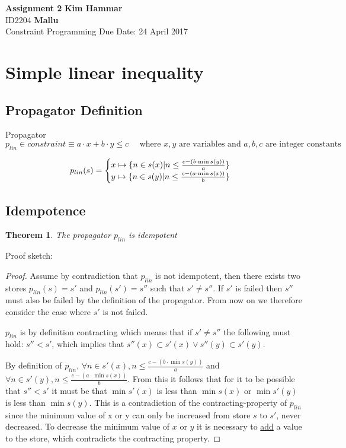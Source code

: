 \documentclass[a4paper, 11pt]{article}
\newtheorem{theorem}{Theorem}[section]
\newcommand\mymapsto{\mathrel{\ooalign{$\rightarrow$\cr%
      \kern-.15ex\raise.275ex\hbox{\scalebox{1}[0.522]{$\mid$}}\cr}}}
\begin{document}
\noindent
\large\textbf{Assignment 2} \hfill \textbf{Kim Hammar} \\
\normalsize ID2204 \hfill  \textbf{Mallu} \\
Constraint Programming \hfill Due Date: 24 April 2017\\

\section*{Simple linear inequality}
\subsection*{Propagator Definition}
Propagator $p_{lin} \in constraint \equiv a \cdot x + b \cdot y \leq c \quad \text{ where }x,y \text{ are variables and } a,b,c \text{ are integer constants} $

\begin{gather*}
p_{lin}(s) = 
\begin{cases}
  x \mymapsto \{n \in s(x) | n \leq \frac{c - (b \cdot \min s(y))}{a} \}\\
  y \mymapsto \{n \in s(y) | n \leq \frac{c - (a \cdot \min s(x))}{b} \}\\
\end{cases}
\end{gather*}
\subsection*{Idempotence}

\begin{theorem}
The propagator $p_{lin}$ is idempotent
\end{theorem}
Proof sketch:

\begin{proof}
Assume by contradiction that $p_{lin}$ is not idempotent, then there exists two stores $p_{lin}(s) = s'$ and $p_{lin}(s') = s''$ such that  $s' \neq s''$. If $s'$ is failed then $s''$ must also be failed by the definition of the propagator. From now on we therefore consider the case where $s'$ is not failed.

  $p_{lin}$ is by definition contracting which means that if $s' \neq s''$ the following must hold: $s'' < s'$, which implies that $s''(x) \subset s'(x) \lor s''(y) \subset s'(y)$.

By definition of $p_{lin}$, $\forall n \in s'(x), n \leq  \frac{c - (b \cdot \min s(y))}{a}$ and $\forall n \in s'(y), n \leq  \frac{c - (a \cdot \min s(x))}{b}$. From this it follows that for it to be possible that $s'' < s'$ it must be that $\min s'(x)$ is less than $\min s(x)$ or $\min s'(y)$ is less than $\min s(y)$. This is a contradiction of the contracting-property of $p_{lin}$ since the minimum value of x or y can only be increased from store $s$ to $s'$, never decreased. To decrease the minimum value of $x$ or $y$ it is necessary to \underline{add} a value to the store, which contradicts the contracting property. 
\end{proof}
\end{document}
